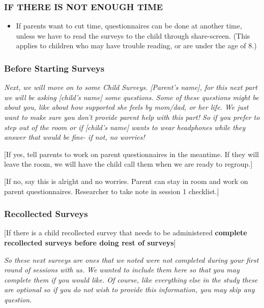 \documentclass[
]{book}
\providecommand{\tightlist}{%
  \setlength{\itemsep}{0pt}\setlength{\parskip}{0pt}}
\begin{document}
\hypertarget{if-there-is-not-enough-time-1}{%
\subsubsection{IF THERE IS NOT ENOUGH TIME}\label{if-there-is-not-enough-time-1}}

\begin{itemize}
\tightlist
\item
  If parents want to cut time, questionnaires can be done at another time, unless we have to read the surveys to the child through share-screen. (This applies to children who may have trouble reading, or are under the age of 8.)
\end{itemize}

\hypertarget{before-starting-surveys}{%
\subsubsection{Before Starting Surveys}\label{before-starting-surveys}}

\emph{Next, we will move on to some Child Surveys. {[}Parent's name{]}, for this next part we will be asking {[}child's name{]} some questions. Some of these questions might be about you, like about how supported she feels by mom/dad, or her life. We just want to make sure you don't provide parent help with this part! So if you prefer to step out of the room or if {[}child's name{]} wants to wear headphones while they answer that would be fine- if not, no worries!}

{[}If yes, tell parents to work on parent questionnaires in the meantime. If they will leave the room, we will have the child call them when we are ready to regroup.{]}

{[}If no, say this is alright and no worries. Parent can stay in room and work on parent questionnaires. Researcher to take note in session 1 checklist.{]}

\hypertarget{recollected-surveys}{%
\subsubsection{Recollected Surveys}\label{recollected-surveys}}

{[}If there is a child recollected survey that needs to be administered \textbf{complete recollected surveys before doing rest of surveys}{]}

\emph{So these next surveys are ones that we noted were not completed during your first round of sessions with us. We wanted to include them here so that you may complete them if you would like. Of course, like everything else in the study these are optional so if you do not wish to provide this information, you may skip any question.}
\end{document}
